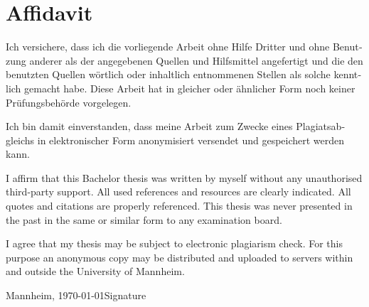 

\chapter*{Affidavit}
\thispagestyle{empty}

\begin{german}
	Ich versichere, dass ich die vorliegende Arbeit ohne Hilfe Dritter und ohne Benutzung anderer
	als der angegebenen Quellen und Hilfsmittel angefertigt und die den benutzten Quellen
	wörtlich oder inhaltlich entnommenen Stellen als solche kenntlich gemacht habe. Diese Arbeit
	hat in gleicher oder ähnlicher Form noch keiner Prüfungsbehörde vorgelegen.
	
	Ich bin damit einverstanden, dass meine Arbeit zum Zwecke eines Plagiatsabgleichs in
	elektronischer Form anonymisiert versendet und gespeichert werden kann.
\end{german}

\vspace{\baselineskip}


\noindent I affirm that this Bachelor thesis was written by myself without any unauthorised third-party support.
All used references and resources are clearly indicated. All quotes and citations are properly referenced.
This thesis was never presented in the past in the same or similar form to any examination board.

I agree that my thesis may be subject to electronic plagiarism check. 
For this purpose an anonymous copy may be distributed and uploaded to servers within and outside the University of Mannheim.

\vspace{4\baselineskip}
\begin{center}
\parbox{.8\textwidth}{Mannheim, \today \hfill Signature}
\end{center}

\endinput
